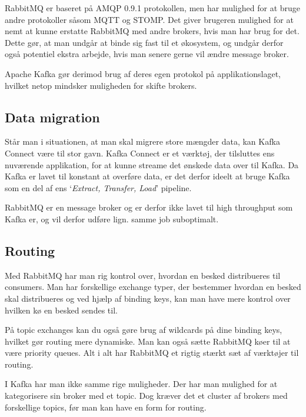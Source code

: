 \documentclass[
]{article}
\begin{document}
RabbitMQ er baseret på AMQP 0.9.1 protokollen, men har mulighed for at
bruge andre protokoller såsom MQTT og STOMP.\cite{rabbit-protocols} Det giver brugeren mulighed for at nemt at kunne erstatte RabbitMQ med andre brokers, hvis man har
brug for det. Dette gør, at man undgår at binde sig fast til et
økosystem, og undgår derfor også potentiel ekstra arbejde, hvis man
senere gerne vil ændre message broker.

Apache Kafka gør derimod brug af deres egen protokol på
applikationslaget, hvilket
netop mindsker muligheden for skifte brokers.\cite{kafka-protocol}

\hypertarget{data-migration}{%
\subsection{Data migration}\label{data-migration}}

Står man i situationen, at man skal migrere store mængder data, kan
Kafka Connect være til stor gavn. Kafka Connect er et værktøj, der
tilsluttes ens nuværende applikation, for at kunne streame det ønskede
data over til Kafka. Da Kafka er lavet til konstant at overføre data, er
det derfor ideelt at bruge Kafka som en del af ens `\emph{Extract,
Transfer, Load}' pipeline.\cite{kafka-connect}


RabbitMQ er en message broker og er derfor ikke lavet til high
throughput som Kafka er, og vil derfor udføre lign. samme job
suboptimalt.\cite{kafka-rabbit-comparison}

\hypertarget{routing}{%
\subsection{Routing}\label{routing}}

Med RabbitMQ har man rig kontrol over, hvordan en besked distribueres
til consumers. Man har forskellige exchange typer\cite{rabbit-exchange-types},
der bestemmer hvordan en besked skal distribueres og ved hjælp af
binding keys, kan man have mere kontrol over hvilken kø en besked sendes
til.\cite{rabbit-routing}

På topic exchanges kan du også gøre brug af wildcards på dine binding
keys, hvilket gør routing mere dynamiske. Man kan også sætte RabbitMQ
køer til at være priority queues.\cite{rabbit-priority-queue} Alt i alt har RabbitMQ et
rigtig stærkt sæt af værktøjer til routing.

I Kafka har man ikke samme rige muligheder. Der har man mulighed for at
kategorisere sin broker med et topic. Dog kræver det et cluster af
brokers med forskellige topics, før man kan have en form for routing.\cite{kafka-routing}
\end{document}
